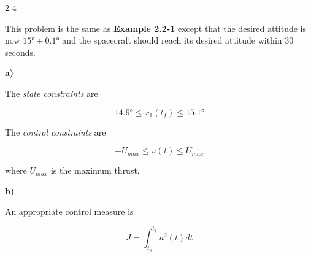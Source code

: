 \begin{problem}{2-4}
\end{problem}

This problem is the same as \textbf{Example 2.2-1} except that the desired
attitude is now $\ang{15} \pm \ang{0.1}$ and the spacecraft should reach its
desired attitude within $30$ seconds.

\noindent \textbf{a)}

The \textit{state constraints} are

\begin{equation}\label{eq:sc_att_15}
    \ang{14.9} \leq x_1(t_f) \leq \ang{15.1} \nonumber
\end{equation}

The \textit{control constraints} are

\begin{equation}\label{eq:sc_att_15}
   -U_{max} \leq u(t) \leq U_{max} \nonumber
\end{equation}

\noindent where $U_{max}$ is the maximum thrust.

\noindent \textbf{b)}

An appropriate control measure is

\begin{equation}
  J = \int_{t_0}^{t_f} u^2(t) dt \nonumber
\end{equation}
